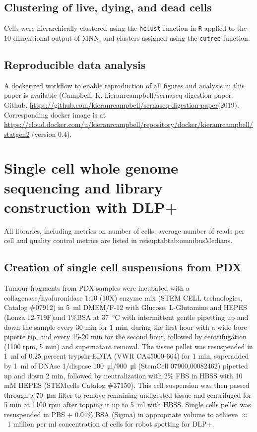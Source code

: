 \subsection{Clustering of live, dying, and dead cells}
Cells were hierarchically clustered using the \texttt{hclust} function in \texttt{R} applied to the 10-dimensional output of MNN, and clusters assigned using the \texttt{cutree} function.

\subsection{Reproducible data analysis}
A dockerized workflow to enable reproduction of all figures and analysis in this paper is available (Campbell, K. kieranrcampbell/scrnaseq-digestion-paper. Github. \url{https://github.com/kieranrcampbell/scrnaseq-digestion-paper}(2019). Corresponding docker image is at \url{https://cloud.docker.com/u/kieranrcampbell/repository/docker/kieranrcampbell/statgen2} (version 0.4).

\section{Single cell whole genome sequencing and library construction with DLP+}

All libraries, including metrics on number of cells, average number of reads per cell and quality control metrics are listed in refsuptab{tab:omnibusMedians}.

\subsection{Creation of single cell suspensions from PDX}
Tumour fragments from PDX samples were incubated with a collagenase/hyaluronidase 1:10 (10X) enzyme mix (STEM CELL technologies, Catalog \#07912) in  \SI{5}{\ml} DMEM/F-12 with Glucose, L-Glutamine and HEPES (Lonza 12-719F)and 1\%BSA at \SI{37}{\degreeCelsius} with intermittent gentle pipetting up and down the sample every 30 min for 1 min, during the first hour with a wide bore pipette tip, and every 15-20 min for the second hour, followed by  centrifugation (1100 rpm, 5 min) and supernatant removal.
The tissue pellet was resuspended in \SI{1}{\ml} of  0.25 percent trypsin-EDTA (VWR CA45000-664) for 1 min, superadded by \SI{1}{\ml} of DNAse 1/dispase \SI{100}{\ul}/\SI{900}{\ul} (StemCell 07900,00082462) pipetted up and down 2 min, followed by neutralization with 2\% FBS in HBSS with 10 mM HEPES (STEMcells Catalog \#37150). 
This cell suspension was then passed through a \SI{70}{\micro\metre} filter to remove remaining undigested tissue and centrifuged for 5 min at 1100 rpm after topping it up to \SI{5}{\ml} with HBSS.
Single cells pellet  was resuspended in PBS + 0.04\% BSA (Sigma) in appropriate volume to achieve  $\approx$~1 million per ml concentration of cells for robot spotting for DLP+.

